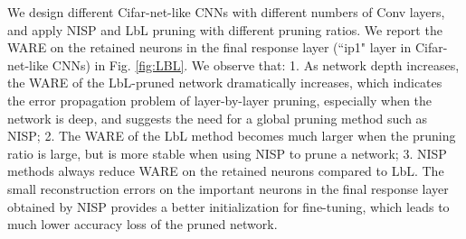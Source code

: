 \documentclass[10pt,twocolumn,letterpaper]{article}
\begin{document}
We design different Cifar-net-like CNNs with different numbers of Conv layers, and apply NISP and LbL pruning with different pruning ratios. We report the WARE on the retained neurons in the final response layer (``ip1" layer in Cifar-net-like CNNs) in Fig. \ref{fig:LBL}. We observe that: 1. As network depth increases, the WARE of the LbL-pruned network dramatically increases, which indicates the error propagation problem of layer-by-layer pruning, especially when the network is deep, and suggests the need for a global pruning method such as NISP; 2. The WARE of the LbL method becomes much larger when the pruning ratio is large, but is more stable when using NISP to prune a network; 3. NISP methods always reduce WARE on the retained neurons compared to LbL. The small reconstruction errors on the important neurons in the final response layer obtained by NISP provides a better initialization for fine-tuning, which leads to much lower accuracy loss of the pruned network.
\end{document}

